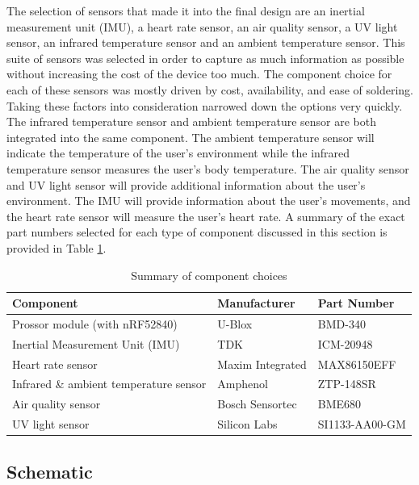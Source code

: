 The selection of sensors that made it into the final design are an inertial 
measurement unit (IMU), a heart rate sensor, an air quality sensor, a UV light 
sensor, an infrared temperature sensor and an ambient temperature sensor. This 
suite of sensors was selected in order to capture as much information as 
possible without increasing the cost of the device too much. The component 
choice for each of these sensors was mostly driven by cost, availability, and 
ease of soldering. Taking these factors into consideration narrowed down the 
options very quickly. The infrared temperature sensor and ambient temperature 
sensor are both integrated into the same component. The ambient temperature 
sensor will indicate the temperature of the user’s environment while the 
infrared temperature sensor measures the user’s body temperature. The air 
quality sensor and UV light sensor will provide additional information about 
the user’s environment. The IMU will provide information about the user’s 
movements, and the heart rate sensor will measure the user’s heart rate. A
summary of the exact part numbers selected for each type of component discussed 
in this section is provided in Table \ref{tab:component-summary}.

\begin{table}[!htb]
\centering
\begin{tabular}{>{\centering\arraybackslash}m{7.0cm}|
                >{\centering\arraybackslash}m{3.5cm}|
                >{\centering\arraybackslash}m{3.5cm}}
\toprule
Component & Manufacturer & Part Number \\
\midrule
Prossor module (with nRF52840) & U-Blox & BMD-340 \\
Inertial Measurement Unit (IMU) & TDK & ICM-20948 \\
Heart rate sensor & Maxim Integrated & MAX86150EFF \\
Infrared \& ambient temperature sensor & Amphenol & ZTP-148SR \\
Air quality sensor & Bosch Sensortec & BME680 \\
UV light sensor & Silicon Labs & SI1133-AA00-GM \\
\bottomrule
\end{tabular}
\caption{Summary of component choices}
\label{tab:component-summary}
\end{table}

\subsection{Schematic}

